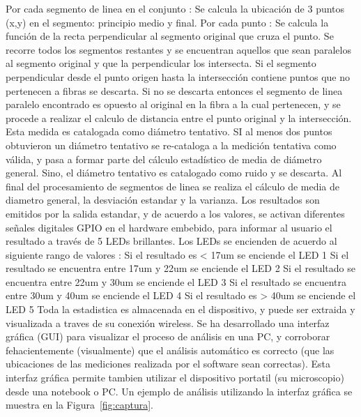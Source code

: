 \documentclass[runningheads,a4paper]{llncs}
\begin{document}
Por cada segmento de linea en el conjunto :
     		Se calcula la ubicación de 3 puntos (x,y) en el segmento: principio medio y final. 
     		Por cada punto :
Se calcula la función de la recta perpendicular al segmento original que cruza el punto. Se recorre todos los segmentos restantes y se encuentran aquellos que sean paralelos al segmento original y que la perpendicular los intersecta.
Si el segmento perpendicular desde el punto origen hasta la intersección contiene puntos que no pertenecen a fibras se descarta.
Si no se descarta entonces el segmento de linea paralelo encontrado es opuesto al original en la fibra a la cual pertenecen, y se procede a realizar el calculo de distancia entre el punto original y la intersección. Esta medida es catalogada como diámetro tentativo.
		SI al menos dos puntos obtuvieron un diámetro tentativo se re-cataloga a la medición tentativa como válida, y pasa a formar parte del cálculo estadístico de media de diámetro general. Sino, el diámetro tentativo es catalogado como ruido y se descarta.
	Al final del procesamiento de segmentos de linea se realiza el cálculo de media de diametro general, la desviación estandar y la varianza.
	Los resultados son emitidos por la salida estandar, y de acuerdo a los valores, se activan diferentes señales digitales GPIO en el hardware embebido, para informar al usuario el resultado a través de 5 LEDs brillantes. Los LEDs se encienden de acuerdo al siguiente rango de valores :
Si el resultado es < 17um se enciende el LED 1
Si el resultado se encuentra entre 17um y 22um se enciende el LED 2
Si el resultado se encuentra entre 22um y 30um se enciende el LED 3
Si el resultado se encuentra entre 30um y 40um se enciende el LED 4
Si el resultado es > 40um se enciende el LED 5
Toda la estadistica es almacenada en el dispositivo, y puede ser extraida y visualizada a traves de su conexión wireless. Se ha desarrollado una interfaz gráfica (GUI) para visualizar el proceso de análisis en una PC, y corroborar fehacientemente (visualmente) que el análisis automático es correcto (que las ubicaciones de las mediciones realizada por el software sean correctas). Esta interfaz gráfica permite tambien utilizar el dispositivo portatil (su microscopio) desde una notebook o PC. Un ejemplo de análisis utilizando la interfaz gráfica se muestra en la Figura~\ref{fig:captura}.
\end{document}

